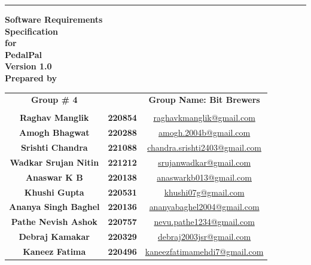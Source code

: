 \documentclass[11pt]{article}
\begin{document}
\begin{titlingpage}
\begin{flushright}
    \rule{16cm}{5pt}\vskip1cm
    \textbf{{\fontsize{30}{36}\selectfont Software Requirements}\\ {\fontsize{30}{36}\selectfont Specification}\\\vspace{1cm}\huge{for}\\\vspace{1cm}\Huge{PedalPal}\\ \vspace{1.5cm}\LARGE{Version 1.0}\\\vspace{1cm}\LARGE{Prepared by}}
\end{flushright}
\vspace{1.0cm}
\large{\begin{tabular*}{\columnwidth}{@{\extracolsep{\stretch{1}}}*{3}{c}@{}}
    \Large{\textbf{Group \# 4}} & & \Large{\textbf{Group Name: Bit Brewers}} \\
    \\
    \textbf{Raghav Manglik} & \textbf{220854} & \href{mailto:raghavkmanglik@gmail.com}{raghavkmanglik@gmail.com} \\
    \textbf{Amogh Bhagwat} & \textbf{220288} & \href{mailto:amogh.2004b@gmail.com}{amogh.2004b@gmail.com} \\
    \textbf{Srishti Chandra} & \textbf{221088} & \href{mailto:chandra.srishti2403@gmail.com}{chandra.srishti2403@gmail.com} \\
    \textbf{Wadkar Srujan Nitin} & \textbf{221212} & \href{mailto:srujanwadkar@gmail.com}{srujanwadkar@gmail.com} \\
    \textbf{Anaswar K B} & \textbf{220138} & \href{mailto:anaswarkb013@gmail.com}{anaswarkb013@gmail.com} \\
    \textbf{Khushi Gupta} & \textbf{220531} & \href{mailto:khushi07g@gmail.com}{khushi07g@gmail.com} \\
    \textbf{Ananya Singh Baghel} & \textbf{220136} & \href{mailto:ananyabaghel2004@gmail.com}{ananyabaghel2004@gmail.com} \\
    \textbf{Pathe Nevish Ashok} & \textbf{220757} & \href{mailto:nevu.pathe1234@gmail.com}{nevu.pathe1234@gmail.com} \\
    \textbf{Debraj Kamakar} & \textbf{220329} & \href{mailto:debraj2003jsr@gmail.com}{debraj2003jsr@gmail.com} \\
    \textbf{Kaneez Fatima} & \textbf{220496} & \href{mailto:kaneezfatimamehdi7@gmail.com}{kaneezfatimamehdi7@gmail.com} \\
    

\end{tabular*}}
\end{titlingpage}
\end{document}
